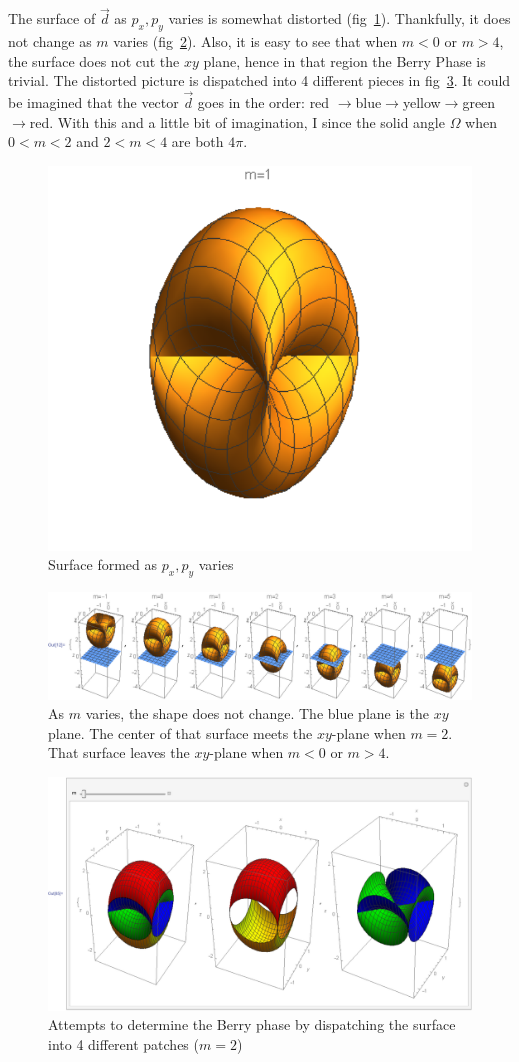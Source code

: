 \documentclass{article}
\begin{document}
    The surface of $\vec{d}$ as $p_x,p_y$ varies is somewhat distorted
    (fig~\ref{fig:BerryPhase/Shape}). Thankfully, it does not change as $m$
    varies (fig~\ref{fig:BerryPhase/AsMVaries}). Also, it is easy to see that
    when $m<0$ or $m>4$, the surface does not cut the $xy$ plane, hence in that
    region the Berry Phase is trivial. The distorted picture is dispatched into
    4 different pieces in fig~\ref{fig:BerryPhase/attempts}. It could be
    imagined that the vector $\vec{d}$ goes in the order: red
    $\to$blue$\to$yellow$\to$green$\to$red. With this and a little bit of
    imagination, I since the solid angle $\Omega$ when $0<m<2$ and $2<m<4$ are
    both $4\pi$.
    \begin{figure}[htpb]
        \centering
        \includegraphics[width=0.5\linewidth]{pics/BerryPhase/Shape.pdf}
        \caption{Surface formed as $p_x,p_y$ varies}
        \label{fig:BerryPhase/Shape}
    \end{figure}
    \begin{figure}[htpb]
        \centering
        \includegraphics[width=0.8\linewidth]{pics/BerryPhase/AsMVaries.pdf}
        \caption{As $m$ varies, the shape does not change. The blue plane is the
        $xy$ plane. The center of that surface meets the $xy$-plane when $m=2$.
        That surface leaves the $xy$-plane when $m<0$ or $m>4$.}
        \label{fig:BerryPhase/AsMVaries}
    \end{figure}
    \begin{figure}[htpb]
        \centering
        \includegraphics[width=0.8\linewidth]{pics/BerryPhase/attempts.pdf}
        \caption{Attempts to determine the Berry phase by dispatching the surface
        into 4 different patches ($m=2$)}
        \label{fig:BerryPhase/attempts}
    \end{figure}
\end{document}
